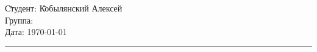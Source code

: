 \begin{tabbing}
    \hspace{11cm} \= Студент: \= Кобылянский Алексей \\
      \> Группа:  \\
      \> Дата: \> \today
    \end{tabbing}
    \hrule
    \vspace{1cm}
    
    
